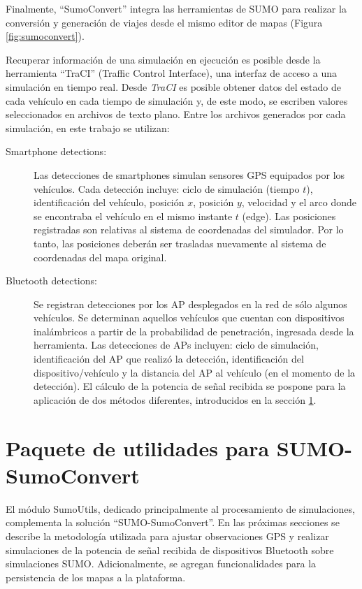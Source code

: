 Finalmente, ``SumoConvert'' integra las herramientas de SUMO para realizar la conversión y generación de viajes desde el mismo editor de mapas (Figura \ref{fig:sumoconvert}).

Recuperar información de una simulación en ejecución es posible desde la herramienta ``TraCI'' (Traffic Control Interface), una interfaz de acceso a una simulación en tiempo real. Desde \textit{TraCI} es posible obtener datos del estado de cada vehículo en cada tiempo de simulación y, de este modo, se escriben valores seleccionados en archivos de texto plano. Entre los archivos generados por cada simulación, en este trabajo se utilizan:

\begin{description}
    \item [Smartphone detections:] Las detecciones de smartphones simulan sensores GPS equipados por los vehículos. Cada detección incluye: ciclo de simulación (tiempo $t$), identificación del vehículo, posición $x$, posición $y$, velocidad y el arco donde se encontraba el vehículo en el mismo instante $t$ (edge). Las posiciones registradas son relativas al sistema de coordenadas del simulador. Por lo tanto, las posiciones deberán ser trasladas nuevamente al sistema de coordenadas del mapa original.
    \item [Bluetooth detections:] Se registran detecciones por los AP desplegados en la red de sólo algunos vehículos. Se determinan aquellos vehículos que cuentan con dispositivos inalámbricos a partir de la probabilidad de penetración, ingresada desde la herramienta. Las detecciones de APs incluyen: ciclo de simulación, identificación del AP que realizó la detección, identificación del dispositivo/vehículo y la distancia del AP al vehículo (en el momento de la detección). El cálculo de la potencia de señal recibida se pospone para la aplicación de dos métodos diferentes, introducidos en la sección \ref{ssec:modulo-sim}.
\end{description}

\section{Paquete de utilidades para SUMO-SumoConvert}\label{ssec:modulo-sim}

El módulo SumoUtils, dedicado principalmente al procesamiento de simulaciones, complementa la solución ``SUMO-SumoConvert''. En las próximas secciones se describe la metodología utilizada para ajustar observaciones GPS y realizar simulaciones de la potencia de señal recibida de dispositivos Bluetooth sobre simulaciones SUMO. Adicionalmente, se agregan funcionalidades para la persistencia de los mapas a la plataforma.


